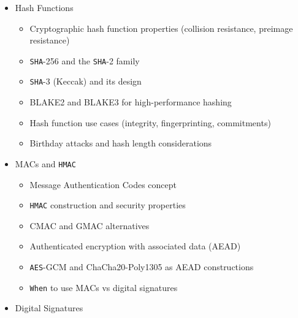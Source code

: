 \documentclass[
]{article}
\providecommand{\tightlist}{%
  \setlength{\itemsep}{0pt}\setlength{\parskip}{0pt}}
\begin{document}
\begin{itemize}
  \begin{itemize}
  \tightlist
  \item
    Public key cryptography fundamentals
  \item
    \texttt{RSA} algorithm, key generation, and key sizes
  \item
    Elliptic Curve Cryptography (ECC) and curve selection
  \item
    Diffie-Hellman key exchange protocol
  \item
    Elliptic Curve Diffie-Hellman (\texttt{ECDH})
  \item
    Hybrid encryption (combining symmetric and asymmetric)
  \item
    Performance comparison of asymmetric algorithms
  \end{itemize}
\item
  Hash Functions

  \begin{itemize}
  \tightlist
  \item
    Cryptographic hash function properties (collision resistance,
    preimage resistance)
  \item
    \texttt{SHA}-256 and the \texttt{SHA}-2 family
  \item
    \texttt{SHA}-3 (Keccak) and its design
  \item
    BLAKE2 and BLAKE3 for high-performance hashing
  \item
    Hash function use cases (integrity, fingerprinting, commitments)
  \item
    Birthday attacks and hash length considerations
  \end{itemize}
\item
  MACs and \texttt{HMAC}

  \begin{itemize}
  \tightlist
  \item
    Message Authentication Codes concept
  \item
    \texttt{HMAC} construction and security properties
  \item
    CMAC and GMAC alternatives
  \item
    Authenticated encryption with associated data (AEAD)
  \item
    \texttt{AES}-GCM and ChaCha20-Poly1305 as AEAD constructions
  \item
    \texttt{When} to use MACs vs digital signatures
  \end{itemize}
\item
  Digital Signatures


\end{itemize}
\end{document}

